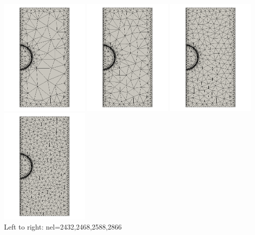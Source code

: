 \begin{center}
\includegraphics[width=4.3cm]{python_codes/fieldstone_92/results/mesh1}
\includegraphics[width=4.3cm]{python_codes/fieldstone_92/results/mesh2}
\includegraphics[width=4.3cm]{python_codes/fieldstone_92/results/mesh3}
\includegraphics[width=4.3cm]{python_codes/fieldstone_92/results/mesh4}\\
{\captionfont Left to right: nel=2432,2468,2588,2866}
\end{center}


